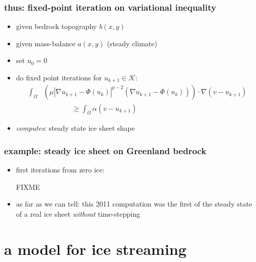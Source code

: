 \documentclass{beamer}
\begin{document}
\begin{frame}
  \frametitle{thus: fixed-point iteration on variational inequality} 

\begin{itemize}
\item given bedrock topography $b(x,y)$
\item given mass-balance $a(x,y)$ (steady climate)
\item set $u_0 = 0$
\item do fixed point iterations for $u_{k+1} \in \mathcal{K}$:
\begin{align*}
\int_{\Omega} &\left( \mu |\nabla u_{k+1} - \Phi(u_k)|^{p-2}
(\nabla u_{k+1} - \Phi(u_k) ) \right) \cdot \nabla (v - u_{k+1}) \\
&\qquad\qquad \ge \int_{\Omega} \alpha (v -  u_{k+1})
\end{align*}

\bigskip
\item \emph{computes}: steady state ice sheet shape
\end{itemize}
\end{frame}


\begin{frame}
  \frametitle{example: steady ice sheet on Greenland bedrock}

\begin{itemize}
\item first iterations from zero ice:

\begin{center}
FIXME
\end{center}
\item as far as we can tell: this 2011 computation was the first of the steady state of a real ice sheet \emph{without} time-stepping
\end{itemize}
\end{frame}


\section[ice streams]{a model for ice streaming}
\end{document}
